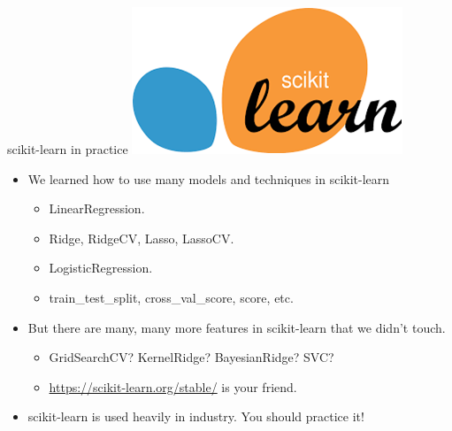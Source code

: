 \documentclass[aspectratio=169]{../latex_main/tntbeamer}  %
\begin{document}
	
	\begin{frame}{scikit-learn in practice}
	    \hfill
	    \includegraphics[scale=.5]{Bild15}
	    \begin{itemize}
	        \item We learned how to use many models and techniques in scikit-learn
	        \begin{itemize}
	            \item LinearRegression.
	            \item Ridge, RidgeCV, Lasso, LassoCV.
	            \item LogisticRegression.
	            \item train\_test\_split, cross\_val\_score, score, etc.
	        \end{itemize}
	        \item But there are many, many more features in scikit-learn that we didn’t touch.
            \begin{itemize}
                \item GridSearchCV? KernelRidge? BayesianRidge? SVC?
                \item \url{https://scikit-learn.org/stable/} is your friend.
            \end{itemize}
	        \item scikit-learn is used heavily in industry. You should practice it!
	    \end{itemize}
	\end{frame}
	
\end{document}
